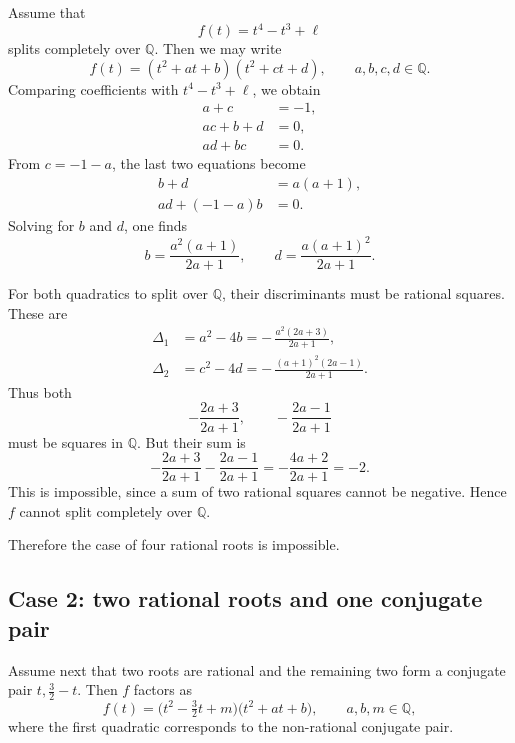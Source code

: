 \documentclass[11pt, a4paper]{article}
\numberwithin{equation}{section}
\begin{document}
Assume that
\begin{equation}
f(t)=t^4-t^3+\ell
\end{equation}
splits completely over \(\mathbb{Q}\). Then we may write
\begin{equation}
f(t)=(t^2+at+b)(t^2+ct+d),
\qquad a,b,c,d\in \mathbb{Q}.
\end{equation}
Comparing coefficients with \(t^4-t^3+\ell\), we obtain
\begin{align}
a+c &= -1, \\
ac+b+d &= 0, \\
ad+bc &= 0.
\end{align}
From \(c=-1-a\), the last two equations become
\begin{align}
b+d &= a(a+1), \\
a d + (-1-a)b &= 0.
\end{align}
Solving for \(b\) and \(d\), one finds
\begin{equation}
b=\frac{a^2(a+1)}{2a+1},
\qquad
d=\frac{a(a+1)^2}{2a+1}.
\end{equation}

For both quadratics to split over \(\mathbb{Q}\), their discriminants must be rational squares. These are
\begin{align}
\Delta_1 &= a^2-4b
= -\,\frac{a^2(2a+3)}{2a+1}, \\
\Delta_2 &= c^2-4d
= -\,\frac{(a+1)^2(2a-1)}{2a+1}.
\end{align}
Thus both
\begin{equation}
-\frac{2a+3}{2a+1},
\qquad
-\frac{2a-1}{2a+1}
\end{equation}
must be squares in \(\mathbb{Q}\). But their sum is
\begin{equation}
-\frac{2a+3}{2a+1}
-
\frac{2a-1}{2a+1}
=
-\frac{4a+2}{2a+1}
=-2.
\end{equation}
This is impossible, since a sum of two rational squares cannot be negative. Hence \(f\) cannot split completely over \(\mathbb{Q}\).

Therefore the case of four rational roots is impossible.

\subsection*{Case 2: two rational roots and one conjugate pair}

Assume next that two roots are rational and the remaining two form a conjugate pair \(t,\frac32-t\). Then \(f\) factors as
\begin{equation}
f(t) = \bigl(t^2-\tfrac32 t+m\bigr)\bigl(t^2+at+b\bigr),
\qquad a,b,m\in \mathbb{Q},
\end{equation}
where the first quadratic corresponds to the non-rational conjugate pair.
\end{document}
